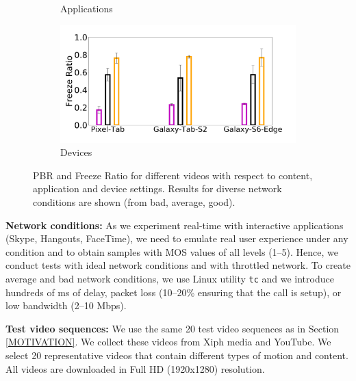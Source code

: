 \begin{figure}
\begin{subfigure}[b]{0.33\textwidth}
        \caption{Applications}
    \end{subfigure}%
    \begin{subfigure}[b]{0.33\textwidth}
        \centering
        \includegraphics[width=1\linewidth]{sections/network-work/dev-stutter}
        \caption{Devices}
    \end{subfigure}
    \caption{PBR and Freeze Ratio for different videos with respect to content, application and device settings. Results for diverse network conditions are shown (from bad, average, good).}
     \label{fig:measurements}
     \vspace*{-1em}
\end{figure}

\noindent \textbf{Network conditions:} As we experiment real-time with interactive applications (Skype, Hangouts, FaceTime), we need to emulate real user experience under any condition and to obtain samples with MOS values of all levels (1--5). Hence, we conduct tests with ideal network conditions and with throttled network. To create average and bad network conditions, we use Linux utility \texttt{tc} and we introduce hundreds of ms of delay, packet loss (10--20\% ensuring that the call is setup), or low bandwidth (2--10 Mbps).  

\noindent \textbf{Test video sequences:} We use the same 20 test video sequences as in Section \ref{MOTIVATION}. 
We collect these videos  from Xiph media \cite{xiph2008org} and YouTube. We select 20 representative videos that contain different types of motion and content.
All videos are downloaded in Full HD (1920x1280) resolution.

